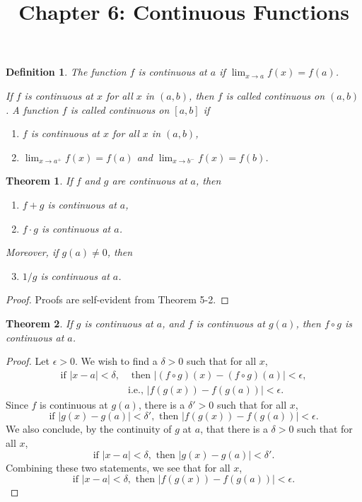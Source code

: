 \documentclass{article}
\newtheorem{definition}{Definition}
\newtheorem{theorem}{Theorem}
\begin{document}
\title{Chapter 6: Continuous Functions}
\maketitle

\begin{definition}
  The function $f$ is \emph{continuous at $a$} if $\lim_{x \to a} f(x) = f(a)$.

  If $f$ is continuous at $x$ for all $x$ in $(a, b)$, then $f$ is called
  \emph{continuous on $(a, b)$}. A function $f$ is called \emph{continuous on
  $[a, b]$} if
  \begin{enumerate}
    \item $f$ is continuous at $x$ for all $x$ in $(a, b)$,
    \item $\lim_{x \to a^+} f(x) = f(a)$ and $\lim_{x \to b^-} f(x) = f(b)$.
  \end{enumerate}
\end{definition}

\begin{theorem}
  If $f$ and $g$ are continuous at $a$, then
  \begin{enumerate}
    \item $f + g$ is continuous at $a$,
    \item $f \cdot g$ is continuous at $a$.
  \end{enumerate}
  Moreover, if $g(a) \neq 0$, then
  \begin{enumerate}
    \setcounter{enumi}{2}
    \item $1/g$ is continuous at $a$.
  \end{enumerate}
\end{theorem}
\begin{proof}
  Proofs are self-evident from Theorem 5-2.
\end{proof}

\begin{theorem}
  If $g$ is continuous at $a$, and $f$ is continuous at $g(a)$, then $f \circ
  g$ is continuous at $a$.
\end{theorem}
\begin{proof}
  Let $\epsilon > 0$. We wish to find a $\delta > 0$ such that for all $x$,
  \begin{align*}
    \text{if } |x - a| < \delta, &\text{ then } |(f \circ g)(x) -
    (f \circ g)(a)| < \epsilon, \\
    &\text{i.e., } |f(g(x)) - f(g(a))| < \epsilon.
  \end{align*}
  Since $f$ is continuous at $g(a)$, there is a $\delta' > 0$ such that for all
  $x$, \[
    \text{if } |g(x) - g(a)| < \delta', \text{ then } |f(g(x)) - f(g(a))| <
      \epsilon.
  \] We also conclude, by the continuity of $g$ at $a$, that there is a $\delta
  > 0$ such that for all $x$, \[
    \text{if } |x - a| < \delta, \text{ then } |g(x) - g(a)| < \delta'.
  \] Combining these two statements, we see that for all $x$, \[
    \text{if } |x - a| < \delta, \text{ then } |f(g(x)) - f(g(a))| < \epsilon.
  \]
\end{proof}
\end{document}
